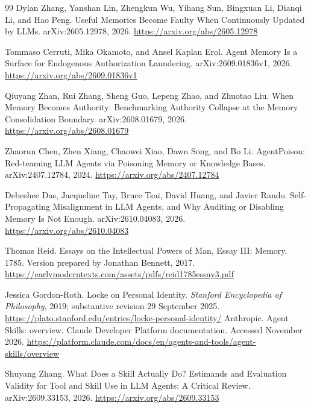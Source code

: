 \documentclass[11pt,a4paper]{article}
\theoremstyle{definition}
\begin{document}
\begin{thebibliography}{99}
Dylan Zhang, Yanshan Lin, Zhengkun Wu, Yihang Sun, Bingxuan Li, Dianqi Li, and Hao Peng.
\newblock Useful Memories Become Faulty When Continuously Updated by LLMs.
\newblock arXiv:2605.12978, 2026.
\newblock \url{https://arxiv.org/abs/2605.12978}

Tommaso Cerruti, Mika Okamoto, and Ansel Kaplan Erol.
\newblock Agent Memory Is a Surface for Endogenous Authorization Laundering.
\newblock arXiv:2609.01836v1, 2026.
\newblock \url{https://arxiv.org/abs/2609.01836v1}

Qiuyang Zhan, Rui Zhang, Sheng Guo, Lepeng Zhao, and Zhuotao Liu.
\newblock When Memory Becomes Authority: Benchmarking Authority Collapse at the Memory Consolidation Boundary.
\newblock arXiv:2608.01679, 2026.
\newblock \url{https://arxiv.org/abs/2608.01679}

Zhaorun Chen, Zhen Xiang, Chaowei Xiao, Dawn Song, and Bo Li.
\newblock AgentPoison: Red-teaming LLM Agents via Poisoning Memory or Knowledge Bases.
\newblock arXiv:2407.12784, 2024.
\newblock \url{https://arxiv.org/abs/2407.12784}

Debeshee Das, Jacqueline Tay, Bruce Tsai, David Huang, and Javier Rando.
\newblock Self-Propagating Misalignment in LLM Agents, and Why Auditing or Disabling Memory Is Not Enough.
\newblock arXiv:2610.04083, 2026.
\newblock \url{https://arxiv.org/abs/2610.04083}

Thomas Reid.
\newblock Essays on the Intellectual Powers of Man, Essay III: Memory. 1785.
\newblock Version prepared by Jonathan Bennett, 2017.
\newblock \url{https://earlymoderntexts.com/assets/pdfs/reid1785essay3.pdf}

Jessica Gordon-Roth.
\newblock Locke on Personal Identity.
\newblock \textit{Stanford Encyclopedia of Philosophy}, 2019; substantive revision 29 September 2025.
\newblock \url{https://plato.stanford.edu/entries/locke-personal-identity/}
Anthropic.
\newblock Agent Skills: overview. Claude Developer Platform documentation.
\newblock Accessed November 2026.
\newblock \url{https://platform.claude.com/docs/en/agents-and-tools/agent-skills/overview}

Shuyang Zhang.
\newblock What Does a Skill Actually Do? Estimands and Evaluation Validity for Tool and Skill Use in LLM Agents: A Critical Review.
\newblock arXiv:2609.33153, 2026.
\newblock \url{https://arxiv.org/abs/2609.33153}


\end{thebibliography}
\end{document}

